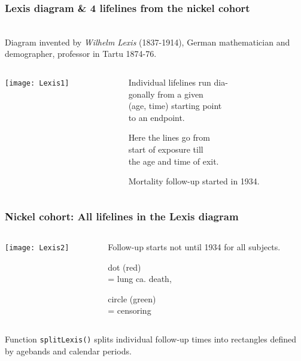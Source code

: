 \documentclass[handout,12pt]{beamer}
\begin{document}
\begin{frame} 
\frametitle{Lexis diagram \& 4 lifelines from the nickel cohort}
\ \\
Diagram invented by {\it Wilhelm Lexis} (1837-1914), 
German mathematician and demographer, professor in
Tartu 1874-76.

\begin{columns}[t]
\begin{column}{0.45\textwidth}
\begin{center}
\texttt{[image: Lexis1]}
\end{center}
\end{column}
\begin{column}{0.45\textwidth}

Individual lifelines run dia-\\
gonally from 
a given\\
 (age, time) starting point\\
to an endpoint. 

\bigskip
Here the lines go from \\
start of exposure till \\
 the age and time of exit.
 
 \bigskip
 Mortality follow-up started in 1934.
\end{column}
\end{columns}

\end{frame} 




\begin{frame}
 \frametitle{Nickel cohort: All lifelines in the Lexis diagram}
 
\begin{columns}[t]
\begin{column}{0.45\textwidth}
 \begin{center}
\texttt{[image: Lexis2]}
\end{center}
\end{column}
\begin{column}{0.45\textwidth}

\bigskip
\bigskip
Follow-up starts not until 1934 for all subjects.

\bi
\item
dot (red) \\ = lung ca. death, 
\item
circle (green)\\  = censoring
\ei  
\end{column}
\end{columns}

Function {\tt splitLexis()} splits individual follow-up times into
rectangles defined by agebands and calendar periods. 
\end{frame} 
\end{document}
